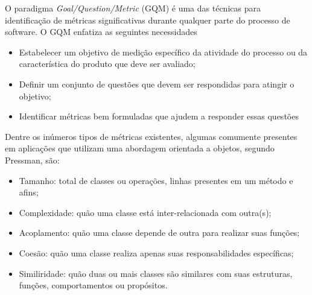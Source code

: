 O paradigma \textit{Goal/Question/Metric} (GQM) \cite{basili_1984} é uma das técnicas para identificação de métricas significativas durante qualquer parte do processo de software. O GQM enfatiza as seguintes necessidades

\begin{itemize}
    \item Estabelecer um objetivo de medição específico da atividade do processo ou da característica do produto que deve ser avaliado;
    \item Definir um conjunto de questões que devem ser respondidas para atingir o objetivo;
    \item Identificar métricas bem formuladas que ajudem a responder essas questões
\end{itemize}

Dentre os inúmeros tipos de métricas existentes, algumas comumente presentes em aplicações que utilizam uma abordagem orientada a objetos, segundo Pressman\cite{pressman_2009}, são:

\begin{itemize}
    \item Tamanho: total de classes ou operações, linhas presentes em um método e afins;
    \item Complexidade: quão uma classe está inter-relacionada com outra(s);
    \item Acoplamento: quão uma classe depende de outra para realizar suas funções;
    \item Coesão: quão uma classe realiza apenas suas responsabilidades específicas;
    \item Similiridade: quão duas ou mais classes são similares com suas estruturas, funções, comportamentos ou propósitos.
\end{itemize}